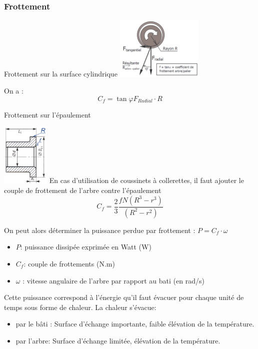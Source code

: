 \documentclass[11pt,oneside]{article}
\begin{document}
\subsubsection{Frottement}
\noindent\begin{minipage}[c]{.45\linewidth}
\begin{center}
Frottement sur la surface cylindrique
\includegraphics[height=3cm]{png/fig23}
\end{center}
On a : 
$$
C_f = \tan \varphi F_{Radial}\cdot R
$$ 
\end{minipage}\hfill
\begin{minipage}[c]{.45\linewidth}
\begin{center}
Frottement sur l'épaulement

\includegraphics[height=3cm]{png/fig24}
En cas d'utilisation de coussinets à collerettes, il faut ajouter le couple de frottement de l'arbre contre l'épaulement
$$
C_f = \dfrac{2}{3}\dfrac{fN\left( R^3-r^3\right)}{\left( R^2-r^2\right)}
$$
\end{center}
\end{minipage}

 
 

On peut alors déterminer la puissance perdue par frottement : $P = C_f \cdot \omega $
\begin{itemize}
\item $P$: puissance dissipée exprimée en Watt (W)
\item $C_f$: couple de frottements (N.m)
\item $\omega$ : vitesse angulaire de l'arbre par rapport au bati (en rad/s)
\end{itemize}

Cette puissance correspond à l'énergie qu'il faut évacuer pour chaque unité de temps sous forme de chaleur. La chaleur s'évacue: 
\begin{itemize}
\item par le bâti : Surface d'échange importante, faible élévation de la température. 
\item par l'arbre: Surface d'échange limitée, élévation de la température. 
\end{itemize}
\end{document}
